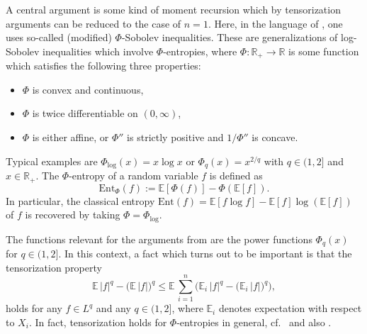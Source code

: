 \documentclass[a4paper,12pt]{amsart}
\numberwithin{equation}{section}
\theoremstyle{remark}
\def\E{{\mathbb E}}
\def\R{{\mathbb R}}
\def\Ent{{\mathrm{Ent}}}
\begin{document}
A central argument is some kind of moment recursion which by tensorization arguments can be reduced to the case of $n=1$. Here, in the language of \cite{BBLM05}, one uses so-called (modified) $\Phi$-Sobolev inequalities. These are generalizations of log-Sobolev inequalities which involve $\Phi$-entropies, where $\Phi:\R_+\to\R$ is some function which satisfies the following three properties:
\begin{itemize}
    \item[(i)] $\Phi$ is convex and continuous,
    \item[(ii)] $\Phi$ is twice differentiable on $(0,\infty)$,
    \item[(iii)] $\Phi$ is either affine, or $\Phi''$ is strictly positive and $1/\Phi''$ is concave.
\end{itemize}
Typical examples are $\Phi_{\log}(x)=x\log x$ or $\Phi_q(x)=x^{2/q}$ with $q\in(1,2]$ and $x\in\R_+$. The $\Phi$-entropy of a random variable $f$ is defined as
$$
\Ent_\Phi(f) := \E[\Phi(f)] - \Phi(\E[f]).
$$
In particular, the classical entropy $\Ent(f)=\E[f\log f]-\E[f]\log(\E[f])$ of $f$ is recovered by taking $\Phi=\Phi_{\log}$.

The functions relevant for the arguments from \cite{BBLM05} are the power functions $\Phi_q(x)$ for $q \in (1,2]$. In this context, a fact which turns out to be important is that the tensorization property
	\begin{equation}
		\label{eq:Tensorisierung}
		\mathbb{E}\, |f|^q - \big(\mathbb{E}\, |f|\big)^q \le 
		\mathbb{E}\, \sum_{i=1}^{n} \Big(\mathbb{E}_i\, |f|^q - 
		\big(\mathbb{E}_i\, |f|\big)^q\Big),
	\end{equation}
holds for any $f \in L^q$ and any $q \in (1,2]$, where $\mathbb{E}_i$ denotes expectation with respect to $X_i$. In fact, tensorization holds for $\Phi$-entropies in general, cf.\ \cite[Prop.\ 4.1]{Led96} and also \cite{LO00}.
\end{document}
